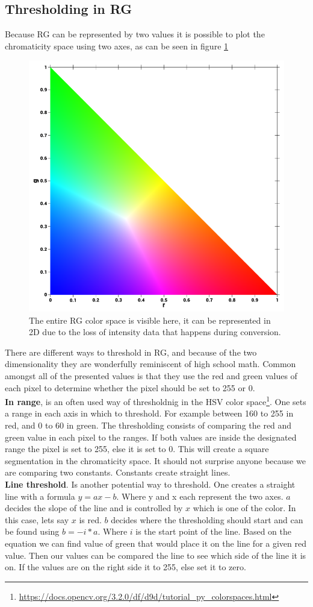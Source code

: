 \subsection{Thresholding in RG}
Because RG can be represented by two values it is possible to plot the  chromaticity space using two axes, as can be seen in figure \ref{fig:rgbNorm}
\begin{figure}[H]
	\centering
	\includegraphics[width=0.5\linewidth]{figure/Analysis/normRGB.png}
	\caption{The entire RG color space is visible here, it can be represented in 2D due to the loss of intensity data that happens during conversion.}
	\label{fig:rgbNorm}
\end{figure}
There are different ways to threshold in RG, and because of the two dimensionality they are wonderfully reminiscent of high school math. Common amongst all of the presented values is that they use the red and green values of each pixel to determine whether the pixel should be set to 255
 or 0.\\
\textbf{In range}, is an often used way of thresholdnig in the HSV color space\footnote{\url{https://docs.opencv.org/3.2.0/df/d9d/tutorial\_py\_colorspaces.html}}. One sets a range in each axis in which to threshold. For example between 160 to 255 in red, and 0 to 60 in green. The thresholding consists of comparing the red and green value in each pixel to the ranges. If both values are inside the designated range the pixel is set to 255, else it is set to 0. This will create a square segmentation in the chromaticity space. It should not surprise anyone because we are comparing two constants. Constants create straight lines. \\

\textbf{Line threshold}. Is another potential way to threshold. One creates a straight line with a formula $ y = ax - b$. Where y and x each represent the two axes. $a$ decides the slope of the line and is controlled by $x$ which is one of the color. In this case, lets say $x$ is red. $b$ decides where the thresholding should start and can be found using $b =- i * a$. Where $i$ is the start point of the line. Based on the equation we can find value of green that would place it on the line for a given red value. Then our values can be compared the line to see which side of the line it is on. If the values are on the right side it to 255, else set it to zero.\\

